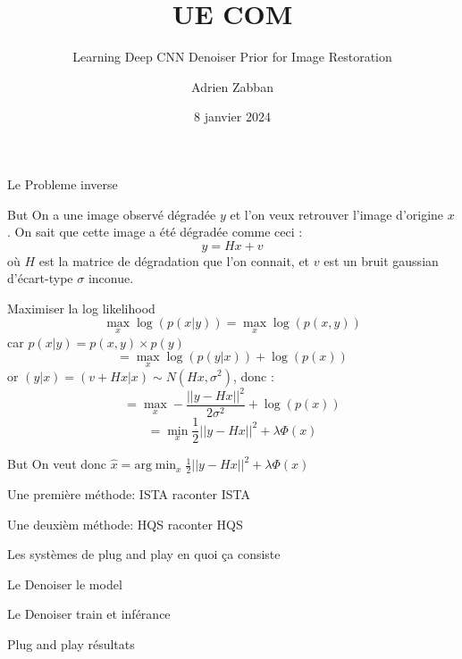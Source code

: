 \documentclass[11pt]{beamer}
\title{UE COM}
\subtitle{Learning Deep CNN Denoiser Prior for Image Restoration}
\author{Adrien Zabban}
\date{8 janvier 2024}
\begin{document}
\maketitle

\begin{frame}{Le Probleme inverse}
    \begin{block}{But}
        On a une image observé dégradée $y$ et l'on veux retrouver l'image d'origine $x$. On sait 
        que cette image a été dégradée comme ceci : 
        $$y = Hx + v$$
        où $H$ est la matrice de 
        dégradation que l'on connait, et $v$ est un bruit gaussian d'écart-type $\sigma$ inconue.
    \end{block}
\end{frame}

\begin{frame}{Maximiser la log likelihood}
    $$ \max_x \log(p(x|y)) = \max_x \log(p(x, y))$$ car $p(x|y) = p(x, y) \times p(y)$
    $$ = \max_x \log(p(y|x)) + \log(p(x))$$
    or $(y|x) = (v+Hx|x) \sim N(Hx, \sigma^2)$, donc :
    $$ = \max_x -\frac{||y-Hx||^2}{2 \sigma^2} + \log(p(x))$$
    $$ = \min_x \frac{1}{2}||y-Hx||^2 + \lambda \Phi(x)$$
    \begin{alertblock}{But}
        On veut donc $\hat{x} = \text{arg} \min_x \frac{1}{2}||y-Hx||^2 + \lambda \Phi(x)$
    \end{alertblock}
\end{frame}

\begin{frame}{Une première méthode: ISTA}
    raconter ISTA
\end{frame}

\begin{frame}{Une deuxièm méthode: HQS}
    raconter HQS
\end{frame}

\begin{frame}{Les systèmes de plug and play}
    en quoi ça consiste
\end{frame}

\begin{frame}{Le Denoiser}
    le model
\end{frame}

\begin{frame}{Le Denoiser}
    train et inférance
\end{frame}

\begin{frame}{Plug and play}
    résultats
\end{frame}
\end{document}
